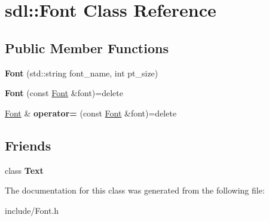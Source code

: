 \hypertarget{classsdl_1_1Font}{\section{sdl\-:\-:Font Class Reference}
\label{classsdl_1_1Font}
}
\subsection*{Public Member Functions}
\begin{DoxyCompactItemize}
\item 
\hypertarget{classsdl_1_1Font_a888859656b371cdc0c6d4d87cc786455}{{\bfseries Font} (std\-::string font\-\_\-name, int pt\-\_\-size)}\label{classsdl_1_1Font_a888859656b371cdc0c6d4d87cc786455}

\item 
\hypertarget{classsdl_1_1Font_a2710dc42df0a7ddbbc1d5e780c44cc8c}{{\bfseries Font} (const \hyperlink{classsdl_1_1Font}{Font} \&font)=delete}\label{classsdl_1_1Font_a2710dc42df0a7ddbbc1d5e780c44cc8c}

\item 
\hypertarget{classsdl_1_1Font_a575a5b17e1e0ca9bcea92f8b76e8b93f}{\hyperlink{classsdl_1_1Font}{Font} \& {\bfseries operator=} (const \hyperlink{classsdl_1_1Font}{Font} \&font)=delete}\label{classsdl_1_1Font_a575a5b17e1e0ca9bcea92f8b76e8b93f}

\end{DoxyCompactItemize}
\subsection*{Friends}
\begin{DoxyCompactItemize}
\item 
\hypertarget{classsdl_1_1Font_aee0ad1dafe471596e6d25530d9fbaf0c}{class {\bfseries Text}}\label{classsdl_1_1Font_aee0ad1dafe471596e6d25530d9fbaf0c}

\end{DoxyCompactItemize}


The documentation for this class was generated from the following file\-:\begin{DoxyCompactItemize}
\item 
include/Font.\-h\end{DoxyCompactItemize}

